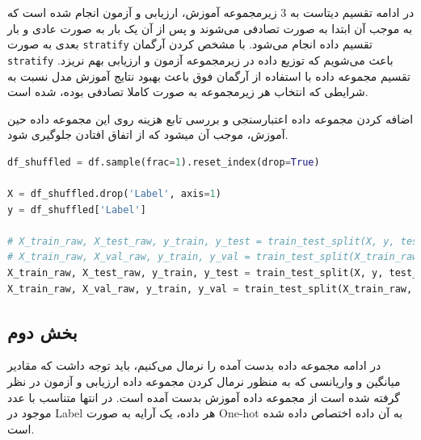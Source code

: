 \documentclass{article}
\begin{document}
در ادامه تقسیم دیتاست به 3 زیرمجموعه آموزش، ارزیابی و آزمون انجام شده است که به موجب آن ابتدا به صورت تصادفی 
می‌شوند و پس از آن یک بار به صورت عادی و بار بعدی به صورت 
\texttt{stratify}
تقسیم داده انجام می‌شود. با مشخص کردن آرگمان 
\texttt{stratify}
باعث می‌شویم که توزیع داده در زیرمجموعه آزمون و ارزیابی بهم نریزد. تقسیم مجموعه داده با استفاده از آرگمان فوق باعث بهبود نتایج آموزش مدل نسبت به شرایطی که انتخاب هر زیرمجموعه به صورت کاملا تصادفی بوده، شده است.

اضافه کردن مجموعه داده اعتبارسنجی و بررسی تابع هزینه روی این مجموعه داده حین آموزش، موجب آن میشود که از اتفاق افتادن 
جلوگیری شود.
\begin{LTR}
	\begin{lstlisting}[language=Python, caption=Train\, Validatiaon\, Test Split]
df_shuffled = df.sample(frac=1).reset_index(drop=True)

X = df_shuffled.drop('Label', axis=1)
y = df_shuffled['Label']

# X_train_raw, X_test_raw, y_train, y_test = train_test_split(X, y, test_size=0.20, random_state=53)
# X_train_raw, X_val_raw, y_train, y_val = train_test_split(X_train_raw, y_train, test_size=0.25, random_state=53)
X_train_raw, X_test_raw, y_train, y_test = train_test_split(X, y, test_size=0.20, stratify=y, random_state=53)
X_train_raw, X_val_raw, y_train, y_val = train_test_split(X_train_raw, y_train, test_size=0.25, stratify=y_train, random_state=53)
	\end{lstlisting}
\end{LTR}

\subsection{بخش دوم}
\label{section2}
 در ادامه مجموعه داده بدست آمده را نرمال می‌کنیم، باید توجه داشت که مقادیر میانگین و واریانسی که به منظور نرمال کردن مجموعه داده ارزیابی و آزمون در نظر گرفته شده است از مجموعه داده آموزش بدست آمده است. در انتها متناسب با عدد موجود در Label هر داده، یک آرایه به صورت 
One-hot
به آن داده اختصاص داده شده است.
 
\end{document}
